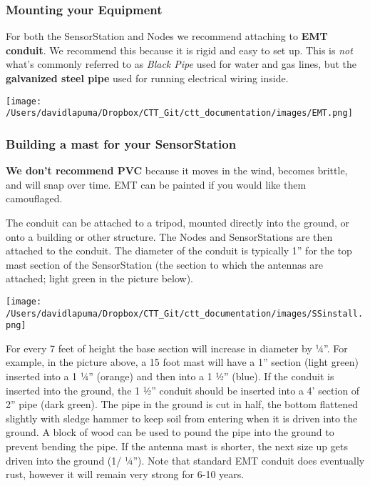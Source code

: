 \documentclass[
]{article}
\begin{document}
\hypertarget{mounting-your-equipment}{%
\subsubsection{Mounting your Equipment}\label{mounting-your-equipment}}

For both the SensorStation and Nodes we recommend attaching to
\textbf{EMT conduit}. We recommend this because it is rigid and easy to
set up. This is \emph{not} what's commonly referred to as \emph{Black
Pipe} used for water and gas lines, but the \textbf{galvanized steel
pipe} used for running electrical wiring inside.

\texttt{[image: /Users/davidlapuma/Dropbox/CTT\_Git/ctt\_documentation/images/EMT.png]}

\hypertarget{building-a-mast-for-your-sensorstation}{%
\subsubsection{Building a mast for your
SensorStation}\label{building-a-mast-for-your-sensorstation}}

\textbf{We don't recommend PVC} because it moves in the wind, becomes
brittle, and will snap over time. EMT can be painted if you would like
them camouflaged.

The conduit can be attached to a tripod, mounted directly into the
ground, or onto a building or other structure. The Nodes and
SensorStations are then attached to the conduit. The diameter of the
conduit is typically 1'' for the top mast section of the SensorStation
(the section to which the antennas are attached; light green in the
picture below).

\texttt{[image: /Users/davidlapuma/Dropbox/CTT\_Git/ctt\_documentation/images/SSinstall.png]}

For every 7 feet of height the base section will increase in diameter by
¼''. For example, in the picture above, a 15 foot mast will have a 1''
section (light green) inserted into a 1 ¼'' (orange) and then into a 1
½'' (blue). If the conduit is inserted into the ground, the 1 ½''
conduit should be inserted into a 4' section of 2'' pipe (dark green).
The pipe in the ground is cut in half, the bottom flattened slightly
with sledge hammer to keep soil from entering when it is driven into the
ground. A block of wood can be used to pound the pipe into the ground to
prevent bending the pipe. If the antenna mast is shorter, the next size
up gets driven into the ground (1/ ¼''). Note that standard EMT conduit
does eventually rust, however it will remain very strong for 6-10 years.
\end{document}
